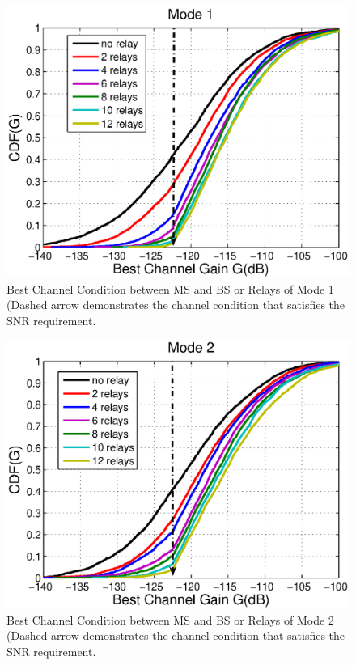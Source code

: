 \begin{figure}
\centering
\includegraphics[width=12cm]{Mode1_bestchannelgain_V2.eps}
\caption{Best Channel Condition between MS and BS or Relays of Mode 1 (Dashed arrow demonstrates the channel condition that satisfies the SNR requirement.}
\label{2:Mode1}
\end{figure}
\begin{figure}
\centering
\includegraphics[width=12cm]{Mode2_bestchannelgain_V2.eps}
\caption{Best Channel Condition between MS and BS or Relays of Mode 2 (Dashed arrow demonstrates the channel condition that satisfies the SNR requirement.}
\label{2:Mode2}
\end{figure}

